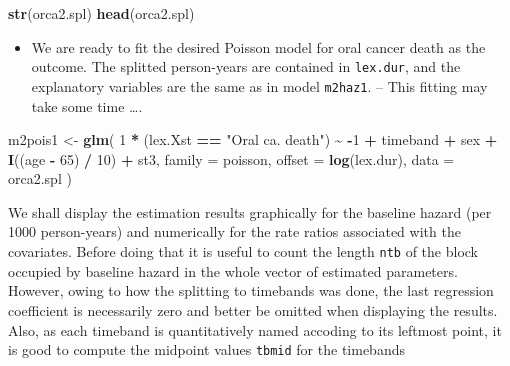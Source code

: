 \documentclass[
]{book}
\newenvironment{Shaded}{\begin{snugshade}}{\end{snugshade}}
\newcommand{\AttributeTok}[1]{\textcolor[rgb]{0.13,0.29,0.53}{#1}}
\newcommand{\DecValTok}[1]{\textcolor[rgb]{0.00,0.00,0.81}{#1}}
\newcommand{\FunctionTok}[1]{\textcolor[rgb]{0.13,0.29,0.53}{\textbf{#1}}}
\newcommand{\NormalTok}[1]{#1}
\newcommand{\OtherTok}[1]{\textcolor[rgb]{0.56,0.35,0.01}{#1}}
\newcommand{\SpecialCharTok}[1]{\textcolor[rgb]{0.81,0.36,0.00}{\textbf{#1}}}
\newcommand{\StringTok}[1]{\textcolor[rgb]{0.31,0.60,0.02}{#1}}
\providecommand{\tightlist}{%
  \setlength{\itemsep}{0pt}\setlength{\parskip}{0pt}}
\begin{document}
\begin{Shaded}
\begin{Highlighting}[]
\FunctionTok{str}\NormalTok{(orca2.spl)}
\FunctionTok{head}\NormalTok{(orca2.spl)}
\end{Highlighting}
\end{Shaded}

\begin{itemize}
\tightlist
\item
  We are ready to fit the desired Poisson model for oral cancer death
  as the outcome. The splitted person-years are contained in \texttt{lex.dur},
  and the explanatory variables are the same as in model \texttt{m2haz1}.
  -- This fitting may take some time \ldots.
\end{itemize}

\begin{Shaded}
\begin{Highlighting}[]
\NormalTok{m2pois1 }\OtherTok{\textless{}{-}} \FunctionTok{glm}\NormalTok{(}
  \DecValTok{1} \SpecialCharTok{*}\NormalTok{ (lex.Xst }\SpecialCharTok{==} \StringTok{"Oral ca. death"}\NormalTok{) }\SpecialCharTok{\textasciitilde{}}
    \SpecialCharTok{{-}}\DecValTok{1} \SpecialCharTok{+}\NormalTok{ timeband }\SpecialCharTok{+}\NormalTok{ sex }\SpecialCharTok{+} \FunctionTok{I}\NormalTok{((age }\SpecialCharTok{{-}} \DecValTok{65}\NormalTok{) }\SpecialCharTok{/} \DecValTok{10}\NormalTok{) }\SpecialCharTok{+}\NormalTok{ st3,}
  \AttributeTok{family =}\NormalTok{ poisson, }\AttributeTok{offset =} \FunctionTok{log}\NormalTok{(lex.dur), }\AttributeTok{data =}\NormalTok{ orca2.spl}
\NormalTok{)}
\end{Highlighting}
\end{Shaded}

We shall display the estimation results graphically for the baseline hazard (per 1000 person-years) and numerically for the rate ratios associated with the covariates.
Before doing that it is useful to count the length \texttt{ntb} of the
block occupied by baseline hazard in the whole vector of estimated parameters.
However, owing to how the splitting to timebands was done, the last regression
coefficient is necessarily
zero and better be omitted when displaying the results. Also, as each timeband
is quantitatively
named accoding to its leftmost point, it is good to compute the midpoint values \texttt{tbmid}
for the timebands
\end{document}
